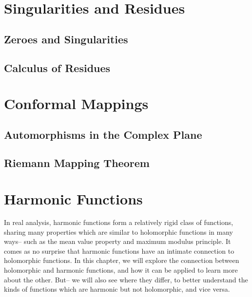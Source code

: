 \documentclass[oneside]{memoir}
\begin{document}




\chapter{Singularities and Residues}
\label{cha:singularities_and_residues}



\section{Zeroes and Singularities}
\label{sec:zeroes_and_singularities}



\section{Calculus of Residues}
\label{sec:calculus_of_residues}




\chapter{Conformal Mappings}
\label{cha:conformal_mappings}

\section{Automorphisms in the Complex Plane}
\label{sec:automorphisms_in_the_complex_plane}



\section{Riemann Mapping Theorem}
\label{sec:riemann_mapping_theorem}



\chapter{Harmonic Functions}
\label{cha:harmonic_functions}

In real analysis, harmonic functions form a relatively rigid class of functions, sharing many properties which are similar to holomorphic functions in many ways-- such as the mean value property and maximum modulus principle. It comes as no surprise that harmonic functions have an intimate connection to holomorphic functions. In this chapter, we will explore the connection between holomorphic and harmonic functions, and how it can be applied to learn more about the other. But-- we will also see where they differ, to better understand the kinds of functions which are harmonic but not holomorphic, and vice versa.
\end{document}
